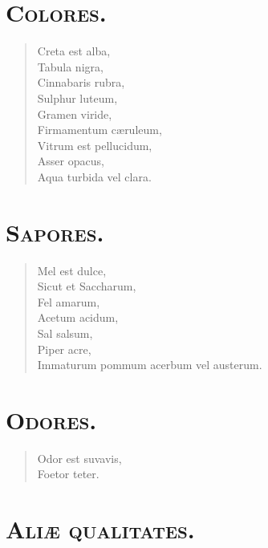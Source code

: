 \documentclass[12pt,  postvopaper]{memoir}
\begin{document}
\section*{\textsc{Colores.}}

\begin{verse}

  Creta est alba,\\
  Tabula nigra,\\
  Cinnabaris rubra,\\
  Sulphur luteum,\\
  Gramen viride,\\
  Firmamentum cæruleum,\\
  Vitrum est pellucidum,\\
  Asser opacus,\\
  Aqua turbida vel clara.\\
\end{verse}


\section*{\textsc{Sapores.}}

\begin{verse}

  Mel est dulce,\\
  Sicut et Saccharum,\\
  Fel amarum,\\
  Acetum acidum,\\
  Sal salsum,\\
  Piper acre,\\
  Immaturum pommum acerbum vel austerum.\\
\end{verse}
\section*{\textsc{Odores.}}

\begin{verse}

  Odor est suvavis,\\
  Foetor teter.\\
\end{verse}
\section*{\textsc{Aliæ qualitates.}}
\end{document}
